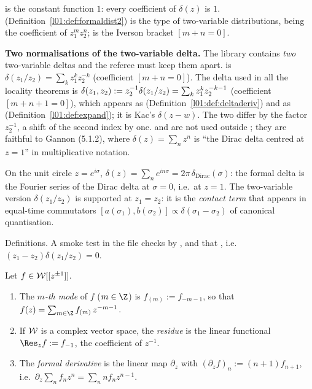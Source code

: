 \begin{dictionary}
 is the constant function $1$: every coefficient of $\delta(z)$ is $1$. 
(Definition~\ref{l01:def:formaldist2}) is the type of two-variable distributions,  being the
coefficient of $z_1^mz_2^n$;  is the Iverson bracket $[m+n=0]$.

\textbf{Two normalisations of the two-variable delta.} The library contains \emph{two} two-variable deltas
and the referee must keep them apart.  is $\delta(z_1/z_2) = \sum_kz_1^kz_2^{-k}$
(coefficient $[m+n=0]$). The delta used in all the locality theorems is
$\delta(z_1,z_2) := z_2^{-1}\delta(z_1/z_2) = \sum_kz_1^kz_2^{-k-1}$ (coefficient $[m+n+1=0]$), which appears
as  (Definition~\ref{l01:def:deltaderiv}) and as 
(Definition~\ref{l01:def:expand}); it is Kac's $\delta(z-w)$. The two differ by the factor $z_2^{-1}$, a
shift of the second index by one.  and  are not used outside
; they are faithful to Gannon (5.1.2), where $\delta(z) = \sum_nz^n$ is ``the
Dirac delta centred at $z = 1$'' in multiplicative notation.
\end{dictionary}

\begin{physics}
On the unit circle $z = e^{i\sigma}$, $\delta(z) = \sum_n e^{in\sigma} = 2\pi\,\delta_{\mathrm{Dirac}}(\sigma)$:
the formal delta is the Fourier series of the Dirac delta at $\sigma = 0$, i.e.\ at $z = 1$. The two-variable
version $\delta(z_1/z_2)$ is supported at $z_1 = z_2$: it is the \emph{contact term} that appears in
equal-time commutators $[a(\sigma_1),b(\sigma_2)]\propto\delta(\sigma_1-\sigma_2)$ of canonical quantisation.
\end{physics}

\begin{status}
Definitions. A smoke test in the file checks  by , and that
, i.e.\ $(z_1-z_2)\delta(z_1/z_2) = 0$.
\end{status}

\begin{definition}\label{l01:def:mode}
Let $f\in\mathcal{W}[[z^{\pm1}]]$.
\begin{enumerate}[label=(\roman*)]
\item The \emph{$m$-th mode} of $f$ ($m\in\Z$) is $f_{(m)} := f_{-m-1}$, so that
  $f(z) = \sum_{m\in\Z}f_{(m)}\,z^{-m-1}$.
\item If $\mathcal{W}$ is a complex vector space, the \emph{residue} is the linear functional
  $\Res_z f := f_{-1}$, the coefficient of $z^{-1}$.
\item The \emph{formal derivative} is the linear map $\partial_z$ with
  $(\partial_zf)_n := (n+1)f_{n+1}$, i.e.\ $\partial_z\sum_n f_nz^n = \sum_n nf_nz^{n-1}$.
\end{enumerate}
\end{definition}

